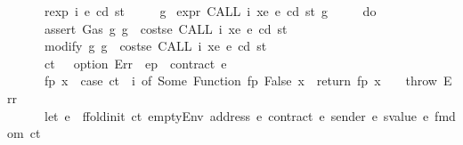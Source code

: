 \begin{isabellebody}
\ \ \ \ \ \ rexp\ i\ e\ cd\ st\isanewline
\ \ \ \ {\isacharbraceright}{\kern0pt}{\isacharparenright}{\kern0pt}\ g{\isachardoublequoteclose}\isanewline
\isanewline
{\isacharbar}{\kern0pt}\ {\isachardoublequoteopen}expr\ {\isacharparenleft}{\kern0pt}CALL\ i\ xe{\isacharparenright}{\kern0pt}\ e\ cd\ st\ g\ {\isacharequal}{\kern0pt}\isanewline
\ \ \ \ {\isacharparenleft}{\kern0pt}do\ {\isacharbraceleft}{\kern0pt}\isanewline
\ \ \ \ \ \ assert\ Gas\ {\isacharparenleft}{\kern0pt}{\isasymlambda}g{\isachardot}{\kern0pt}\ g\ {\isachargreater}{\kern0pt}\ costs\isactrlsub e\ {\isacharparenleft}{\kern0pt}CALL\ i\ xe{\isacharparenright}{\kern0pt}\ e\ cd\ st{\isacharparenright}{\kern0pt}{\isacharsemicolon}{\kern0pt}\isanewline
\ \ \ \ \ \ modify\ {\isacharparenleft}{\kern0pt}{\isasymlambda}g{\isachardot}{\kern0pt}\ g\ {\isacharminus}{\kern0pt}\ costs\isactrlsub e\ {\isacharparenleft}{\kern0pt}CALL\ i\ xe{\isacharparenright}{\kern0pt}\ e\ cd\ st{\isacharparenright}{\kern0pt}{\isacharsemicolon}{\kern0pt}\isanewline
\ \ \ \ \ \ {\isacharparenleft}{\kern0pt}ct{\isacharcomma}{\kern0pt}\ {\isacharunderscore}{\kern0pt}{\isacharparenright}{\kern0pt}\ {\isasymleftarrow}\ option\ Err\ {\isacharparenleft}{\kern0pt}{\isasymlambda}{\isacharunderscore}{\kern0pt}{\isachardot}{\kern0pt}\ ep\ {\isachardollar}{\kern0pt}{\isachardollar}{\kern0pt}\ {\isacharparenleft}{\kern0pt}contract\ e{\isacharparenright}{\kern0pt}{\isacharparenright}{\kern0pt}{\isacharsemicolon}{\kern0pt}\isanewline
\ \ \ \ \ \ {\isacharparenleft}{\kern0pt}fp{\isacharcomma}{\kern0pt}\ x{\isacharparenright}{\kern0pt}\ {\isasymleftarrow}\ case\ ct\ {\isachardollar}{\kern0pt}{\isachardollar}{\kern0pt}\ i\ of\ Some\ {\isacharparenleft}{\kern0pt}Function\ {\isacharparenleft}{\kern0pt}fp{\isacharcomma}{\kern0pt}\ False{\isacharcomma}{\kern0pt}\ x{\isacharparenright}{\kern0pt}{\isacharparenright}{\kern0pt}\ {\isasymRightarrow}\ return\ {\isacharparenleft}{\kern0pt}fp{\isacharcomma}{\kern0pt}\ x{\isacharparenright}{\kern0pt}\ {\isacharbar}{\kern0pt}\ {\isacharunderscore}{\kern0pt}\ {\isasymRightarrow}\ throw\ Err{\isacharsemicolon}{\kern0pt}\isanewline
\ \ \ \ \ \ let\ e{\isacharprime}{\kern0pt}\ {\isacharequal}{\kern0pt}\ ffold{\isacharunderscore}{\kern0pt}init\ ct\ {\isacharparenleft}{\kern0pt}emptyEnv\ {\isacharparenleft}{\kern0pt}address\ e{\isacharparenright}{\kern0pt}\ {\isacharparenleft}{\kern0pt}contract\ e{\isacharparenright}{\kern0pt}\ {\isacharparenleft}{\kern0pt}sender\ e{\isacharparenright}{\kern0pt}\ {\isacharparenleft}{\kern0pt}svalue\ e{\isacharparenright}{\kern0pt}{\isacharparenright}{\kern0pt}\ {\isacharparenleft}{\kern0pt}fmdom\ ct{\isacharparenright}{\kern0pt}{\isacharsemicolon}{\kern0pt}\isanewline

\end{isabellebody}
